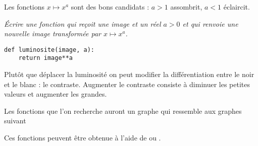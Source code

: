 Les fonctions $x \mapsto x^a$ sont des bons candidats : $a>1$ assombrit, $a<1$ éclaircit.
\begin{Exercise}[title=Luminosité,label=ex:lum]\it Écrire une fonction  qui reçoit une image et un réel $a>0$ et qui renvoie une nouvelle image transformée par $x\mapsto x^a$.
\end{Exercise}
\begin{Answer} 

\begin{lstlisting}
def luminosite(image, a):
    return image**a
\end{lstlisting}
\end{Answer}
\medskip

Plutôt que déplacer la luminosité on peut modifier la différentiation entre le noir et le blanc : le contraste.
 Augmenter le contraste consiste à diminuer les petites valeurs et augmenter les grandes.

Les fonctions que l'on recherche auront un graphe qui ressemble aux graphes suivant

\begin{center}
\hskip 2cm
\end{center}

Ces fonctions peuvent être obtenue à l'aide de  ou . 


